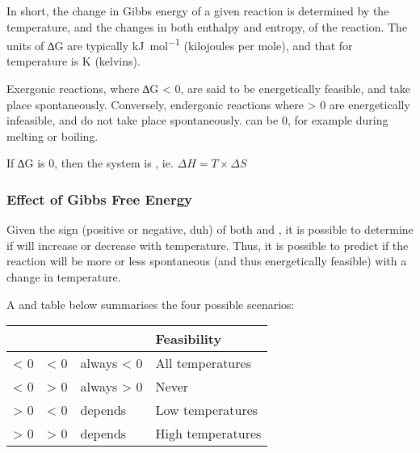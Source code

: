 			In short, the change in Gibbs energy of a given reaction is determined by the temperature, and the changes in both enthalpy and entropy,
			of the reaction. The units of ∆G are typically \si{\kilo\joule\per\mole} (kilojoules per mole), and that for temperature is \si{\kelvin}
			(kelvins).

			Exergonic reactions, where ∆G < 0, are said to be energetically feasible, and take place spontaneously. Conversely, endergonic
			reactions where \gibb{} > 0 are energetically infeasible, and do not take place spontaneously. \gibb{} can be 0, for example during
			melting or boiling.

			If ∆G is 0, then the system is , ie. $\Delta H = T\times \Delta S$

			\subsubsection{Effect of Gibbs Free Energy}

				Given the sign (positive or negative, duh) of both \enth{} and \entr{}, it is possible to determine if \gibb{} will increase
				or decrease with temperature. Thus, it is possible to predict if the reaction will be more or less spontaneous
				(and thus energetically feasible) with a change in temperature.

				A  and  table below summarises the four possible scenarios:

				\begin{center}\begin{table}[htb]\renewcommand{\arraystretch}{1.5}
				\begin{tabu} to \textwidth {| X[c,m] | X[c,m] | X[c,m] | X[c,m] |}

					\hline		\enth{}		&	\entr{}		&	\gibb{}		&		Feasibility			\\

					\hline		< 0			&	< 0			&	always < 0	&		All temperatures	\\
					\hline		< 0			&	> 0			&	always > 0	&				Never		\\
					\hline		> 0			&	< 0			&	depends		&		Low temperatures	\\
					\hline		> 0			&	> 0			&	depends		&		High temperatures	\\
					\hline

				\end{tabu}
				\end{table}\end{center}\vspace{-10mm}

